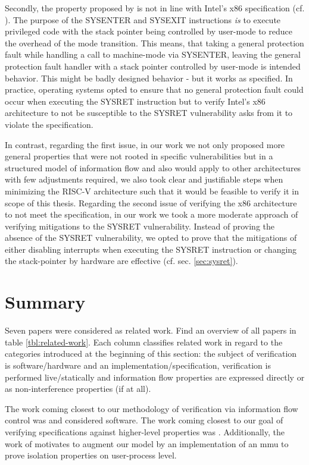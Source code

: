 Secondly, the property proposed by \citeauthor{BradfieldS16} is not in line with Intel's x86 specification (cf. \cite{Dunlap19}).
The purpose of the SYSENTER and SYSEXIT instructions \textit{is} to execute privileged code with the stack pointer being controlled by user-mode to reduce the overhead of the mode transition.
This means, that taking a general protection fault while handling a call to machine-mode via SYSENTER, leaving the general protection fault handler with a stack pointer controlled by user-mode is intended behavior.
This might be badly designed behavior - but it works as specified.
In practice, operating systems opted to ensure that no general protection fault could occur when executing the SYSRET instruction but to verify Intel's x86 architecture to not be susceptible to the SYSRET vulnerability asks from it to violate the specification.

In contrast, regarding the first issue, in our work we not only proposed more general properties that were not rooted in specific vulnerabilities but in a structured model of information flow and also would apply to other architectures with few adjustments required, we also took clear and justifiable steps when minimizing the RISC-V architecture such that it would be feasible to verify it in scope of this thesis.
Regarding the second issue of verifying the x86 architecture to not meet the specification, in our work we took a more moderate approach of verifying mitigations to the SYSRET vulnerability.
Instead of proving the absence of the SYSRET vulnerability, we opted to prove that the mitigations of either disabling interrupts when executing the SYSRET instruction or changing the stack-pointer by hardware are effective (cf. sec. \ref{sec:sysret}).

\section{Summary}

Seven papers were considered as related work.
Find an overview of all papers in table \ref{tbl:related-work}.
Each column classifies related work in regard to the categories introduced at the beginning of this section: the subject of verification is software/hardware and an implementation/specification, verification is performed live/statically and information flow properties are expressed directly or as non-interference properties (if at all).

The work coming closest to our methodology of verification via information flow control was \cite{GordonKPGNR15,SuhLZD04} and considered software.
The work coming closest to our goal of verifying specifications against higher-level properties was \cite{Fox02,KhakpourSD13,BradfieldS16}.
Additionally, the work of \cite{SuhLZD04,KhakpourSD13} motivates to augment our model by an implementation of an \gls{mmu} to prove isolation properties on user-process level.

